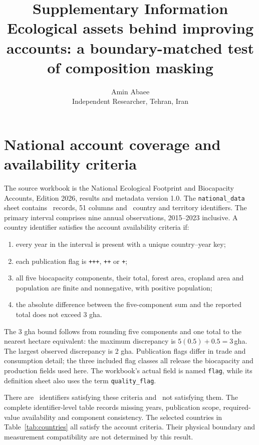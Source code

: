 \documentclass[11pt,a4paper]{article}
\title{Supplementary Information\\\large Ecological assets behind improving accounts: a boundary-matched test of composition masking}
\author{Amin Abaee\\\small Independent Researcher, Tehran, Iran}
\date{}
\begin{document}
\maketitle

\section{National account coverage and availability criteria}

The source workbook is the National Ecological Footprint and Biocapacity Accounts, Edition 2026, results and metadata version 1.0. The \texttt{national\_data} sheet contains \NationalRows\ records, 51 columns and \CountryIDs\ country and territory identifiers. The primary interval comprises nine annual observations, 2015--2023 inclusive. A country identifier satisfies the account availability criteria if:
\begin{enumerate}
\item every year in the interval is present with a unique country--year key;
\item each publication flag is \texttt{+++}, \texttt{++} or \texttt{+};
\item all five biocapacity components, their total, forest area, cropland area and population are finite and nonnegative, with positive population;
\item the absolute difference between the five-component sum and the reported total does not exceed 3 gha.
\end{enumerate}
The 3 gha bound follows from rounding five components and one total to the nearest hectare equivalent: the maximum discrepancy is $5(0.5)+0.5=3$\,gha. The largest observed discrepancy is 2 gha. Publication flags differ in trade and consumption detail; the three included flag classes all release the biocapacity and production fields used here. The workbook's actual field is named \texttt{flag}, while its definition sheet also uses the term \texttt{quality\_flag}.

There are \AccountPass\ identifiers satisfying these criteria and \AccountFail\ not satisfying them. The complete identifier-level table records missing years, publication scope, required-value availability and component consistency. The selected countries in Table~\ref{tab:countries} all satisfy the account criteria. Their physical boundary and measurement compatibility are not determined by this result.
\end{document}
